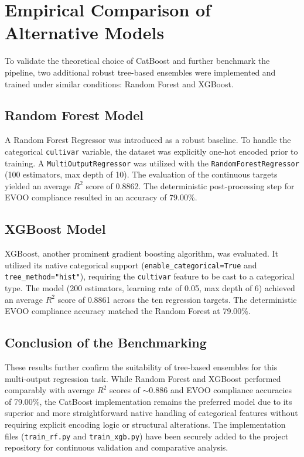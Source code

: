 \documentclass[11pt,a4paper]{article}
\begin{document}
\section{Empirical Comparison of Alternative Models}
\label{sec:model_comparison}

To validate the theoretical choice of CatBoost and further benchmark the pipeline, two additional robust tree-based ensembles were implemented and trained under similar conditions: Random Forest and XGBoost. 

\subsection{Random Forest Model}
A Random Forest Regressor was introduced as a robust baseline. To handle the categorical \texttt{cultivar} variable, the dataset was explicitly one-hot encoded prior to training. A \texttt{MultiOutputRegressor} was utilized with the \texttt{RandomForestRegressor} (100 estimators, max depth of 10). The evaluation of the continuous targets yielded an average $R^2$ score of 0.8862. The deterministic post-processing step for EVOO compliance resulted in an accuracy of 79.00\%.

\subsection{XGBoost Model}
XGBoost, another prominent gradient boosting algorithm, was evaluated. It utilized its native categorical support (\texttt{enable\_categorical=True} and \texttt{tree\_method="hist"}), requiring the \texttt{cultivar} feature to be cast to a categorical type. The model (200 estimators, learning rate of 0.05, max depth of 6) achieved an average $R^2$ score of 0.8861 across the ten regression targets. The deterministic EVOO compliance accuracy matched the Random Forest at 79.00\%.

\subsection{Conclusion of the Benchmarking}
These results further confirm the suitability of tree-based ensembles for this multi-output regression task. While Random Forest and XGBoost performed comparably with average $R^2$ scores of $\sim$0.886 and EVOO compliance accuracies of 79.00\%, the CatBoost implementation remains the preferred model due to its superior and more straightforward native handling of categorical features without requiring explicit encoding logic or structural alterations. The implementation files (\texttt{train\_rf.py} and \texttt{train\_xgb.py}) have been securely added to the project repository for continuous validation and comparative analysis.
\end{document}
